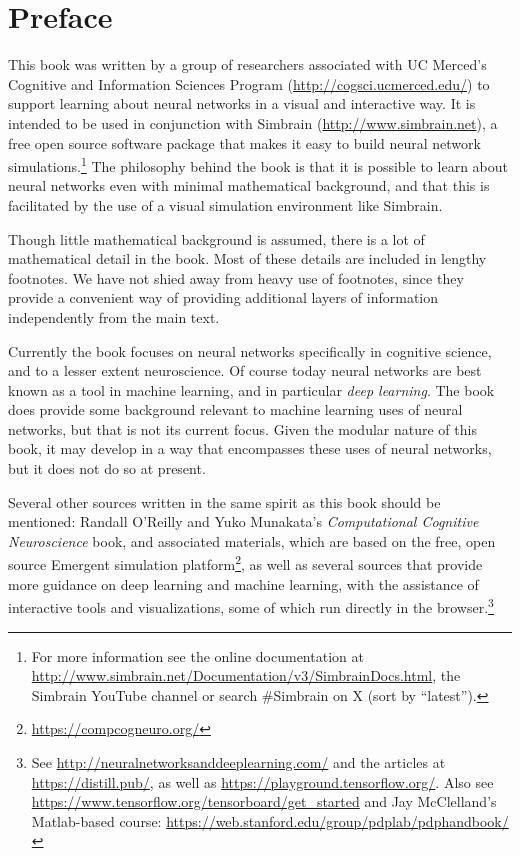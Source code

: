 \chapter*{Preface}\label{ch_preface}

This book was written by a group of researchers associated with UC Merced's Cognitive and Information Sciences Program (\url{http://cogsci.ucmerced.edu/}) to support learning about neural networks in a visual and interactive way. It is intended to be used in conjunction with Simbrain (\url{http://www.simbrain.net}), a free open source software package that makes it easy to build neural network simulations.\footnote{For more information see the online documentation at \url{http://www.simbrain.net/Documentation/v3/SimbrainDocs.html}, the Simbrain YouTube channel or search \#Simbrain on X (sort by ``latest'').} The philosophy behind the book is that it is possible to learn about neural networks even with minimal mathematical background, and that this is facilitated by the use of a visual simulation environment like Simbrain.

Though little mathematical background is assumed, there is a lot of mathematical detail in the book. Most of these details are included in lengthy footnotes. We have not shied away from heavy use of footnotes, since they provide a convenient way of providing additional layers of information independently from the main text. 

Currently the book focuses on neural networks specifically in cognitive science, and to a lesser extent neuroscience. Of course today neural networks are best known as a tool in machine learning, and in particular \emph{deep learning}. The book does provide some background relevant to machine learning uses of neural networks, but that is not its current focus. Given the modular nature of this book, it may develop in a way that encompasses these uses of neural networks, but it does not do so at present.

Several other sources written in the same spirit as this book should be mentioned: Randall O'Reilly and Yuko Munakata's \emph{Computational Cognitive Neuroscience} book, and associated materials, which are based on the free, open source Emergent simulation platform\footnote{\url{https://compcogneuro.org/}}, as well as several sources that provide more guidance on deep learning and machine learning, with the assistance of interactive tools and visualizations, some of which run directly in the browser.\footnote{See \url{http://neuralnetworksanddeeplearning.com/} and the articles at \url{https://distill.pub/}, as well as \url{https://playground.tensorflow.org/}. Also see  \url{https://www.tensorflow.org/tensorboard/get_started} and Jay McClelland's Matlab-based course: \url{https://web.stanford.edu/group/pdplab/pdphandbook/}}

